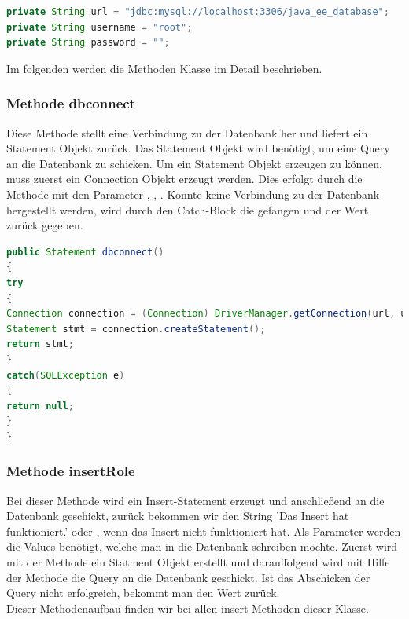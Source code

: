 \begin{lstlisting}[language=JAVA, caption=Datenbankanbindung.java/Datenfelder, firstnumber=30]
private String url = "jdbc:mysql://localhost:3306/java_ee_database";
private String username = "root";
private String password = "";
\end{lstlisting}
\newpage
Im folgenden werden die Methoden Klasse  im Detail beschrieben.
 
\subsubsection{Methode dbconnect\(\)}
Diese Methode stellt eine Verbindung zu der Datenbank her und liefert ein Statement Objekt zurück. Das Statement Objekt wird benötigt, um eine Query an die Datenbank zu schicken.
Um ein Statement Objekt erzeugen zu können, muss zuerst ein Connection Objekt erzeugt werden. Dies erfolgt durch die Methode  mit den Parameter , , . Konnte keine Verbindung zu der Datenbank hergestellt werden, wird durch den Catch-Block die  gefangen und der Wert  zurück gegeben.

\begin{lstlisting}[language=JAVA, caption=Datenbankanbindung.java/Methode-dbconnect, firstnumber=44]
public Statement dbconnect()
{   
try
{
Connection connection = (Connection) DriverManager.getConnection(url, username, password);
Statement stmt = connection.createStatement();
return stmt;
}
catch(SQLException e)
{
return null;
}
}
\end{lstlisting}

\newpage

\subsubsection{Methode insertRole\(\)}

Bei dieser Methode wird ein Insert-Statement erzeugt und anschließend an die Datenbank geschickt, zurück bekommen wir den String 'Das Insert hat funktioniert.' oder , wenn das Insert nicht funktioniert hat. Als Parameter werden die Values benötigt, welche man in die Datenbank schreiben möchte. Zuerst wird mit der Methode  ein Statment Objekt erstellt und darauffolgend wird mit Hilfe der  Methode die Query an die Datenbank geschickt. Ist das Abschicken der Query nicht erfolgreich, bekommt man den Wert  zurück.\\
Dieser Methodenaufbau finden wir bei allen insert-Methoden dieser Klasse.


